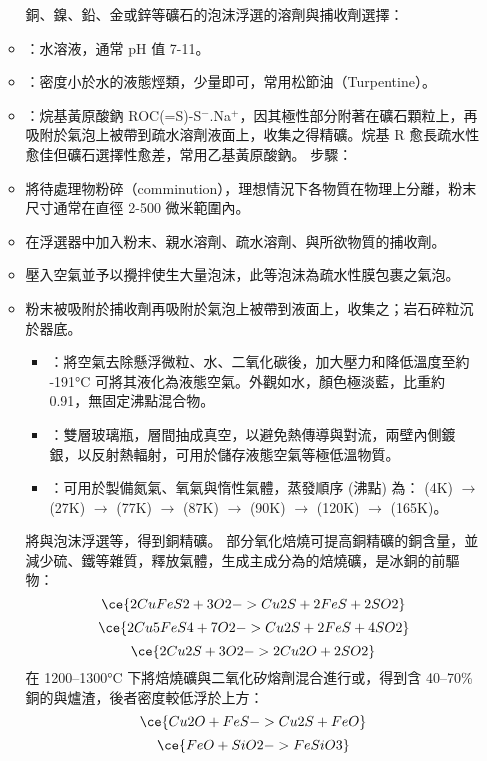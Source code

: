 \documentclass[a4paper,12pt]{report}
\begin{document}
\begin{itemize}
\begin{itemize}
銅、鎳、鉛、金或鋅等礦石的泡沫浮選的溶劑與捕收劑選擇：
\bit
\item {}：水溶液，通常 pH 值 7-11。
\item {}：密度小於水的液態烴類，少量即可，常用松節油（Turpentine）。
\item {}：烷基黃原酸鈉 ROC(=S)-S$^-$.Na$^+$，因其極性部分附著在礦石顆粒上，再吸附於氣泡上被帶到疏水溶劑液面上，收集之得精礦。烷基 R 愈長疏水性愈佳但礦石選擇性愈差，常用乙基黃原酸鈉。
\eit
步驟：
\ben
\item 將待處理物粉碎（comminution），理想情況下各物質在物理上分離，粉末尺寸通常在直徑 2-500 微米範圍內。
\item 在浮選器中加入粉末、親水溶劑、疏水溶劑、與所欲物質的捕收劑。
\item 壓入空氣並予以攪拌使生大量泡沫，此等泡沫為疏水性膜包裹之氣泡。
\item 粉末被吸附於捕收劑再吸附於氣泡上被帶到液面上，收集之；岩石碎粒沉於器底。
\een
{}
\begin{itemize}
\item {}：將空氣去除懸浮微粒、水、二氧化碳後，加大壓力和降低溫度至約 -191°C 可將其液化為液態空氣。外觀如水，顏色極淡藍，比重約 0.91，無固定沸點混合物。
\item {}：雙層玻璃瓶，層間抽成真空，以避免熱傳導與對流，兩壁內側鍍銀，以反射熱輻射，可用於儲存液態空氣等極低溫物質。
\item {}：可用於製備氮氣、氧氣與惰性氣體，蒸發順序 (沸點) 為： (4K) $\rightarrow$ (27K) $\rightarrow$ (77K) $\rightarrow$ (87K) $\rightarrow$ (90K) $\rightarrow$ (120K) $\rightarrow$ (165K)。
\end{itemize}
將與泡沫浮選等，得到銅精礦。
部分氧化焙燒可提高銅精礦的銅含量，並減少硫、鐵等雜質，釋放氣體，生成主成分為的焙燒礦，是冰銅的前驅物：
\[\ce{2CuFeS2 + 3O2 -> Cu2S + 2FeS + 2SO2}\]
\[\ce{2Cu5FeS4 + 7O2 -> Cu2S + 2FeS + 4SO2}\]
\[\ce{2Cu2S + 3O2 -> 2Cu2O + 2SO2}\]
在 1200–1300°C 下將焙燒礦與二氧化矽熔劑混合進行或，得到含 40–70\% 銅的與爐渣，後者密度較低浮於上方：
\[\ce{Cu2O + FeS -> Cu2S + FeO}\]
\[\ce{FeO + SiO2 -> FeSiO3}\]

\end{itemize}
\end{itemize}
\end{document}
